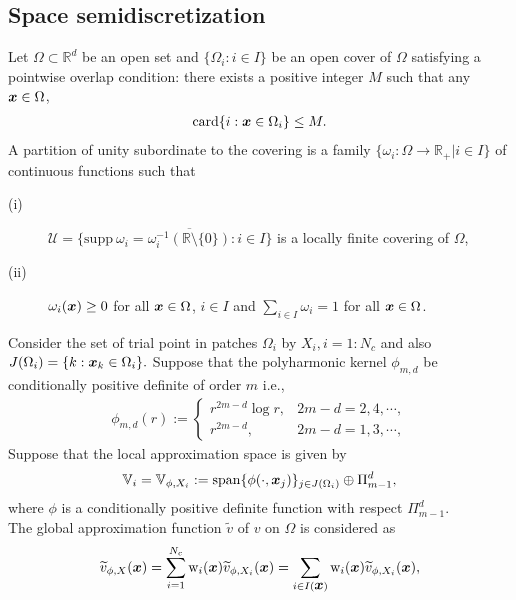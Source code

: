 \documentclass[9pt]{article}
\numberwithin{equation}{section}
\def\bfm#1{\protect{\makebox{\boldmath $#1$}}}
\def\x {\bfm{x}}
\begin{document}
\subsection{Space semidiscretization} 
Let $\Omega\subset \mathbb{R}^d$ be an open set and $\{\Omega_i:i \in I\}$ be an open cover of $\Omega$ satisfying a pointwise overlap condition:
there exists a positive integer $M$ such that any $\x \in \Omega$,
\begin{eqnarray*}
\mathrm{card}\{i:\x \in \Omega_i\}\leq M.
\end{eqnarray*}
A partition of unity subordinate to the covering is a family $\{\omega_i:\Omega\rightarrow \mathbb{R}_{+}|i\in I\}$ of
continuous functions such that
\begin{description}
  \item[(i)] $\mathcal{U}=\{\mathrm{supp}~ \omega_i=\overline{\omega_i^{-1}(\mathbb{R}\setminus\{0\})}:i \in I\}$ is a locally finite covering of $\Omega$,
  \item[(ii)] $\omega_i(\x) \geq 0$ for all $\x \in \Omega$, $i \in I$ and $\sum_{i\in I}\omega_{i}=1$ for all $\x \in \Omega$.
\end{description}
Consider the set of trial point in patches $\Omega_{i}$ by $X_{i},i=1:N_{c}$ and also $J(\Omega_{i})=\{k: \x_{k} \in \Omega_{i}\}.$ Suppose that the polyharmonic kernel $\phi _{m,d}$ be conditionally positive definite of order $m$ i.e.,
\begin{eqnarray*}
\phi_{m,d}(r):=\left\{
                 \begin{array}{ll}
                   r^{2m-d}\log r, & 2m-d=2,4,\cdots, \\
                   r^{2m-d}, & 2m-d=1,3,\cdots,
                 \end{array}
               \right.
\end{eqnarray*}
Suppose that the local approximation space is given by
\begin{eqnarray}\label{a11}
\mathbb{V}_{i}=\mathbb{V}_{\phi,X_{i}}:=\mathrm{span}\{\phi(\cdot,\x_{j})\}_{j \in J(\Omega_{i})}\oplus \Pi^{d}_{m-1},\nonumber
\end{eqnarray}
where $\phi$ is a conditionally positive definite function with respect $\Pi^{d}_{m-1}$.\\
The global approximation function $\widetilde{v}$ of $v$ on $\Omega$ is considered as
\begin{eqnarray}\label{a10}
\widetilde{v}_{\phi,X}(\x)=\sum_{i=1}^{N_{c}}\mathrm{w}_{i}(\x)\widetilde{v}_{\phi,X_i}(\x)=\sum_{i \in I(\x)}\mathrm{w}_{i}(\x)\widetilde{v}_{\phi,X_i}(\x),
\end{eqnarray}
\end{document}
